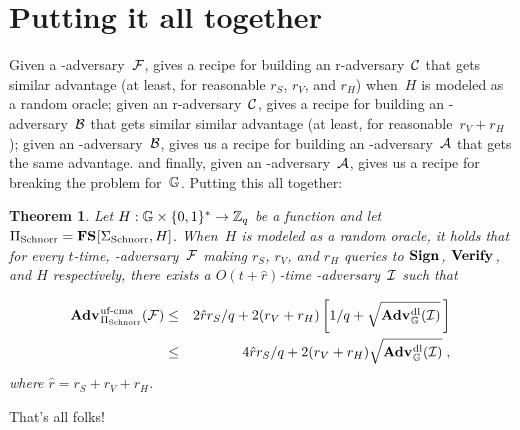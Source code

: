 \documentclass{article}
\newtheorem{theorem}{Theorem}
\theoremstyle{remark}
\begin{document}
\section{Putting it all together}

Given a \ufcma-adversary~$\mathcal{F}$,  gives a recipe for building an
r-adversary~$\mathcal{C}$ that gets similar advantage (at least, for reasonable
$r_S$, $r_V$, and $r_H$) when~$H$ is modeled as a random oracle;
%
given an r-adversary~$\mathcal{C}$,  gives a recipe for building an
-adversary~$\mathcal{B}$ that gets similar similar advantage (at least, for
reasonable~$r_V + r_H$);
%
given an -adversary~$\mathcal{B}$,  gives us a recipe for building an
-adversary~$\mathcal{A}$ that gets the same advantage.
%
and finally, given an -adversary~$\mathcal{A}$,  gives us a recipe for
breaking the \dl problem for~$\mathbb{G}$.
%
Putting this all together:

\begin{theorem}
  Let $H:\mathbb{G}\times\{0,1\}^*\to\mathbb{Z}_q$ be a function and let ${\Pi_{\mathrm{Schnorr}}} =
  \textup{\textbf{FS}}\hspace{0.5pt}[{\Sigma_{\mathrm{Schnorr}}},H]$.
  When~$H$ is modeled as a random oracle, it holds that for every $t$-time,
  \ufcma-adversary~$\mathcal{F}$ making $r_S$, $r_V$, and $r_H$ queries to $\textup{\textbf{Sign}}\hspace{0.5pt}$,
  $\textup{\textbf{Verify}}\hspace{0.5pt}$, and $H$ respectively, there exists a $O(t+\hat{r})$-time
  \dl-adversary~$\mathcal{I}$ such that

  \begin{eqnarray}
    \Adv{\ufcma}_{\SSchnorr}(\F) &\leq&
      2\hat{r}r_S/q
      + 2(r_V+r_H)\left[1/q + \sqrt{\Adv{\dl}_{\G}(\I)}\,\right] \\
    &\leq&
      4\hat{r}r_S/q
       + 2(r_V+r_H)\sqrt{\Adv{\dl}_{\G}(\I)}
    \;,
  \end{eqnarray}
  where $\hat{r}=r_S + r_V + r_H$.
\end{theorem}

\noindent
That's all folks!
\end{document}
